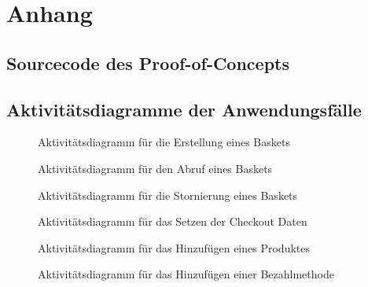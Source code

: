 
\chapter{Anhang}

\section{Sourcecode des Proof-of-Concepts} \label{label:sourcecode}


\section{Aktivitätsdiagramme der Anwendungsfälle}

\begin{figure}[h!]
	\centering
	
	\caption{Aktivitätsdiagramm für die Erstellung eines Baskets}
	\label{fig:SL-Basketcreation}
\end{figure}

\begin{figure}[h!]
	\centering
	
	\caption{Aktivitätsdiagramm für den Abruf eines Baskets}
	\label{fig:SL-Basketabruf}
\end{figure}

\begin{figure}[h!]
	\centering
	
	\caption{Aktivitätsdiagramm für die Stornierung eines Baskets}
	\label{fig:SL-Basketstornierung}
\end{figure}

\begin{figure}[h!]
	\centering
	
	\caption{Aktivitätsdiagramm für das Setzen der Checkout Daten}
	\label{fig:SL-Checkoutdata}
\end{figure}

\begin{figure}[h!]
	\centering
	
	\caption{Aktivitätsdiagramm für das Hinzufügen eines Produktes }
	\label{fig:SL-AddProduct}
\end{figure}

\begin{figure}[h!]
	\centering
	
	\caption{Aktivitätsdiagramm für das Hinzufügen einer Bezahlmethode}
	\label{fig:SL-PutBezahlmethode}
\end{figure}

